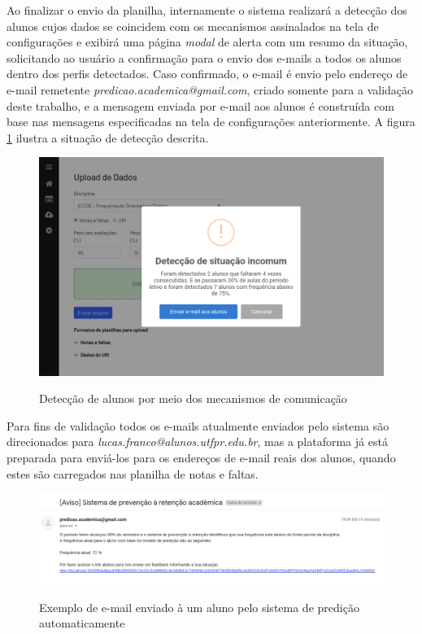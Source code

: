Ao finalizar o envio da planilha, internamente o sistema realizará a detecção dos alunos cujos dados se coincidem com os mecanismos assinalados na tela de configurações e exibirá uma página \textit{modal} de alerta com um resumo da situação, solicitando ao usuário a confirmação para o envio dos e-mails a todos os alunos dentro dos perfis detectados.
Caso confirmado, o e-mail é envio pelo endereço de e-mail remetente 
\textit{predicao.academica@gmail.com}, criado somente para a validação deste trabalho, e a mensagem enviada por e-mail aos alunos é construída com base nas mensagens especificadas na tela de configurações anteriormente.
A figura \ref{fig:sistema-upload-3} ilustra a situação de detecção descrita.

\begin{figure}[!htb]
    \centering
    \caption{Detecção de alunos por meio dos mecanismos de comunicação}
    \includegraphics[width=1\textwidth]{./dados/figuras/sistema/sistema-upload-3}
    \label{fig:sistema-upload-3}
\end{figure}

Para fins de validação todos os e-mails atualmente enviados pelo sistema são direcionados para \textit{lucas.franco@alunos.utfpr.edu.br}, mas a plataforma já está preparada para enviá-los para os endereços de e-mail reais dos alunos, quando estes são carregados nas planilha de notas e faltas.

\begin{figure}[!htb]
    \centering
    \caption{Exemplo de e-mail enviado à um aluno pelo sistema de predição automaticamente}
    \includegraphics[width=1\textwidth]{./dados/figuras/sistema/sistema-email}
    \label{fig:sistema-email}
\end{figure}

